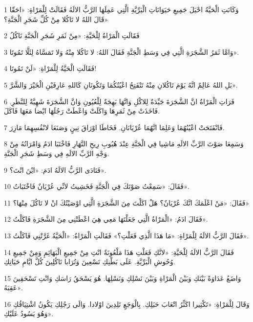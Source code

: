 \par 1 وَكَانَتِ الْحَيَّةُ احْيَلَ جَمِيعِ حَيَوَانَاتِ الْبَرِّيَّةِ الَّتِي عَمِلَهَا الرَّبُّ الالَهُ فَقَالَتْ لِلْمَرْاةِ: «احَقّا قَالَ اللهُ لا تَاكُلا مِنْ كُلِّ شَجَرِ الْجَنَّةِ؟»
\par 2 فَقَالَتِ الْمَرْاةُ لِلْحَيَّةِ: «مِنْ ثَمَرِ شَجَرِ الْجَنَّةِ نَاكُلُ
\par 3 وَامَّا ثَمَرُ الشَّجَرَةِ الَّتِي فِي وَسَطِ الْجَنَّةِ فَقَالَ اللهُ: لا تَاكُلا مِنْهُ وَلا تَمَسَّاهُ لِئَلَّا تَمُوتَا».
\par 4 فَقَالَتِ الْحَيَّةُ لِلْمَرْاةِ: «لَنْ تَمُوتَا!
\par 5 بَلِ اللهُ عَالِمٌ انَّهُ يَوْمَ تَاكُلانِ مِنْهُ تَنْفَتِحُ اعْيُنُكُمَا وَتَكُونَانِ كَاللهِ عَارِفَيْنِ الْخَيْرَ وَالشَّرَّ».
\par 6 فَرَاتِ الْمَرْاةُ انَّ الشَّجَرَةَ جَيِّدَةٌ لِلاكْلِ وَانَّهَا بَهِجَةٌ لِلْعُيُونِ وَانَّ الشَّجَرَةَ شَهِيَّةٌ لِلنَّظَرِ. فَاخَذَتْ مِنْ ثَمَرِهَا وَاكَلَتْ وَاعْطَتْ رَجُلَهَا ايْضا مَعَهَا فَاكَلَ.
\par 7 فَانْفَتَحَتْ اعْيُنُهُمَا وَعَلِمَا انَّهُمَا عُرْيَانَانِ. فَخَاطَا اوْرَاقَ تِينٍ وَصَنَعَا لانْفُسِهِمَا مَازِرَ.
\par 8 وَسَمِعَا صَوْتَ الرَّبِّ الالَهِ مَاشِيا فِي الْجَنَّةِ عِنْدَ هُبُوبِ رِيحِ النَّهَارِ فَاخْتَبَا ادَمُ وَامْرَاتُهُ مِنْ وَجْهِ الرَّبِّ الالَهِ فِي وَسَطِ شَجَرِ الْجَنَّةِ.
\par 9 فَنَادَى الرَّبُّ الالَهُ ادَمَ: «ايْنَ انْتَ؟».
\par 10 فَقَالَ: «سَمِعْتُ صَوْتَكَ فِي الْجَنَّةِ فَخَشِيتُ لانِّي عُرْيَانٌ فَاخْتَبَاتُ».
\par 11 فَقَالَ: «مَنْ اعْلَمَكَ انَّكَ عُرْيَانٌ؟ هَلْ اكَلْتَ مِنَ الشَّجَرَةِ الَّتِي اوْصَيْتُكَ انْ لا تَاكُلَ مِنْهَا؟»
\par 12 فَقَالَ ادَمُ: «الْمَرْاةُ الَّتِي جَعَلْتَهَا مَعِي هِيَ اعْطَتْنِي مِنَ الشَّجَرَةِ فَاكَلْتُ».
\par 13 فَقَالَ الرَّبُّ الالَهُ لِلْمَرْاةِ: «مَا هَذَا الَّذِي فَعَلْتِ؟» فَقَالَتِ الْمَرْاةُ: «الْحَيَّةُ غَرَّتْنِي فَاكَلْتُ».
\par 14 فَقَالَ الرَّبُّ الالَهُ لِلْحَيَّةِ: «لانَّكِ فَعَلْتِ هَذَا مَلْعُونَةٌ انْتِ مِنْ جَمِيعِ الْبَهَائِمِ وَمِنْ جَمِيعِ وُحُوشِ الْبَرِّيَّةِ. عَلَى بَطْنِكِ تَسْعِينَ وَتُرَابا تَاكُلِينَ كُلَّ ايَّامِ حَيَاتِكِ.
\par 15 وَاضَعُ عَدَاوَةً بَيْنَكِ وَبَيْنَ الْمَرْاةِ وَبَيْنَ نَسْلِكِ وَنَسْلِهَا. هُوَ يَسْحَقُ رَاسَكِ وَانْتِ تَسْحَقِينَ عَقِبَهُ».
\par 16 وَقَالَ لِلْمَرْاةِ: «تَكْثِيرا اكَثِّرُ اتْعَابَ حَبَلِكِ. بِالْوَجَعِ تَلِدِينَ اوْلادا. وَالَى رَجُلِكِ يَكُونُ اشْتِيَاقُكِ وَهُوَ يَسُودُ عَلَيْكِ».
